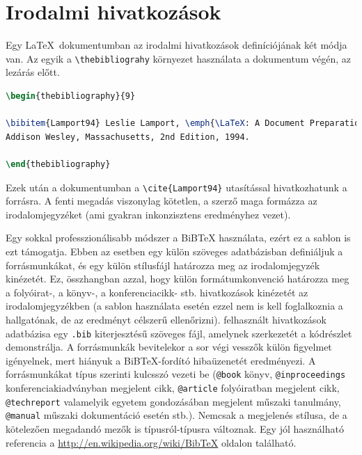 \section{Irodalmi hivatkozások}
\label{sec:HowtoReference}
Egy \LaTeX~dokumentumban az irodalmi hivatkozások definíciójának két módja van. Az egyik a \verb+\thebibliograhy+ környezet használata a dokumentum végén, az \verb++ lezárás előtt.
\begin{lstlisting}[language=tex]
\begin{thebibliography}{9}

\bibitem{Lamport94} Leslie Lamport, \emph{\LaTeX: A Document Preparation System}.
Addison Wesley, Massachusetts, 2nd Edition, 1994.

\end{thebibliography}
\end{lstlisting}

Ezek után a dokumentumban a \verb+\cite{Lamport94}+ utasítással hivatkozhatunk a forrásra. A fenti megadás viszonylag kötetlen, a szerző maga formázza az irodalomjegyzéket (ami gyakran inkonzisztens eredményhez vezet).

Egy sokkal professzionálisabb módszer a BiB\TeX{} használata, ezért ez a sablon is ezt támogatja. Ebben az esetben egy külön szöveges adatbázisban definiáljuk a forrásmunkákat, és egy külön stílusfájl határozza meg az irodalomjegyzék kinézetét. Ez, összhangban azzal, hogy külön formátumkonvenció határozza meg a folyóirat-, a könyv-, a konferenciacikk- stb. hivatkozások kinézetét az irodalomjegyzékben (a sablon használata esetén ezzel nem is kell foglalkoznia a hallgatónak, de az eredményt célszerű ellenőrizni). felhasznált hivatkozások adatbázisa egy \verb+.bib+ kiterjesztésű szöveges fájl, amelynek szerkezetét a  kódrészlet demonstrálja. A forrásmunkák bevitelekor a sor végi vesszők külön figyelmet igényelnek, mert hiányuk a BiB\TeX-fordító hibaüzenetét eredményezi. A forrásmunkákat típus szerinti kulcsszó vezeti be (\verb+@book+ könyv, \verb+@inproceedings+ konferenciakiadványban megjelent cikk, \verb+@article+ folyóiratban megjelent cikk, \verb+@techreport+ valamelyik egyetem gondozásában megjelent műszaki tanulmány, \verb+@manual+ műszaki dokumentáció esetén stb.). Nemcsak a megjelenés stílusa, de a kötelezően megadandó mezők is típusról-típusra változnak. Egy jól használható referencia a \url{http://en.wikipedia.org/wiki/BibTeX} oldalon található.

